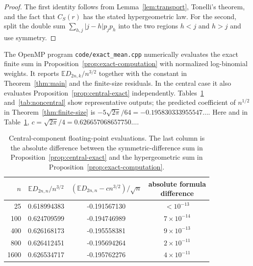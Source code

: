 \documentclass[twoside,10pt]{article}
\numberwithin{equation}{section}
\theoremstyle{slbody}
\theoremstyle{definition}
\theoremstyle{remark}
\newcommand{\E}{\mathbb{E}}
\newcommand{\1}{\mathbf{1}}
\begin{document}
\begin{proof}
The first identity follows from Lemma~\ref{lem:transport}, Tonelli's theorem,
and the fact that $C_S(r)$ has the stated hypergeometric law.  For the second,
split the double sum $\sum_{h,j}|j-h|p_jp_h$ into the two regions $h<j$ and
$h>j$ and use symmetry.
\end{proof}

The OpenMP program \texttt{code/exact\_mean.cpp} numerically evaluates the
exact finite sum in Proposition~\ref{prop:exact-computation} with normalized
log-binomial weights.
It reports $\E D_{2n,k}/n^{3/2}$ together with the constant in
Theorem~\ref{thm:main} and the finite-size residuals.  In the central case it
also evaluates Proposition~\ref{prop:central-exact} independently.
Tables~\ref{tab:numerics} and~\ref{tab:noncentral} show representative
outputs; the predicted
coefficient of $n^{1/2}$ in Theorem~\ref{thm:finite-size} is
$-5\sqrt{2\pi}/64=-0.195830333955547\ldots$.
Here and in Table~\ref{tab:numerics},
$c=\sqrt{2\pi}/4=0.626657068657750\ldots$.

\begin{table}[!htbp]
\centering
\small
\begin{tabular}{rccc}
$n$ & $\E D_{2n,n}/n^{3/2}$
& $(\E D_{2n,n}-cn^{3/2})/\sqrt n$
& \shortstack{absolute formula\\difference}\\
\hline
25   & 0.618994383 & -0.191567130 & $<10^{-13}$\\
100  & 0.624709599 & -0.194746989 & $7\times10^{-14}$\\
400  & 0.626168173 & -0.195558381 & $9\times10^{-13}$\\
800  & 0.626412451 & -0.195694264 & $2\times10^{-11}$\\
1600 & 0.626534717 & -0.195762276 & $4\times10^{-11}$
\end{tabular}
\caption{Central-component floating-point evaluations.  The last column is
the absolute difference between the symmetric-difference sum in
Proposition~\ref{prop:central-exact} and the hypergeometric sum in
Proposition~\ref{prop:exact-computation}.}
\label{tab:numerics}
\end{table}
\end{document}
